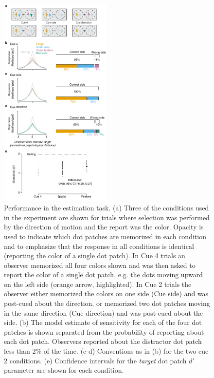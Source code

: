 \begin{figure}
\centering
\includegraphics[keepaspectratio,width=0.5\textwidth]{figs_c4/f4b_estimation_perf.pdf}
\caption[Estimation task performance]{Performance in the estimation task. (a) Three of the conditions used in the experiment are shown for trials where selection was performed by the direction of motion and the report was the color. Opacity is used to indicate which dot patches are memorized in each condition and to emphasize that the response in all conditions is identical (reporting the color of a single dot patch). In Cue 4 trials an observer memorized all four colors shown and was then asked to report the color of a single dot patch, e.g. the dots moving upward on the left side (orange arrow, highlighted). In Cue 2 trials the observer either memorized the colors on one side (Cue side) and was post-cued about the direction, or memorized two dot patches moving in the same direction (Cue direction) and was post-cued about the side. (b) The model estimate of sensitivity for each of the four dot patches is shown separated from the probability of reporting about each dot patch. Observers reported about the distractor dot patch less than 2\% of the time. (c-d) Conventions as in (b) for the two cue 2 conditions. (e) Confidence intervals for the \textit{target} dot patch $d'$ parameter are shown for each condition.}
\label{fig:c4f6}
\end{figure}

